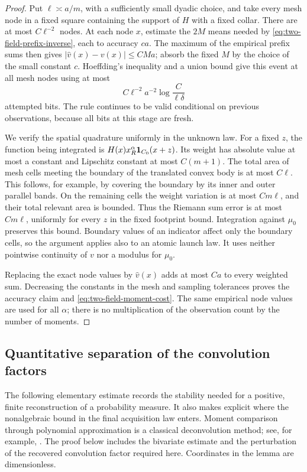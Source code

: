 \begin{proof}
Put $\ell\asymp a/m$, with a sufficiently small dyadic choice,
and take every mesh node in a fixed square containing the support
of $H$ with a fixed collar.  There are at most $C\ell^{-2}$ nodes.
At each node $x$, estimate the $2M$ means needed by
\eqref{eq:two-field-prefix-inverse}, each to accuracy $c a$.
The maximum of the empirical prefix sums then gives
$|\widehat v(x)-v(x)|\le C M a$; absorb the fixed $M$ by the
choice of the small constant $c$.  Hoeffding's inequality and a
union bound give this event at all mesh nodes using at most
\[
 C\ell^{-2}a^{-2}\log\frac{C}{\ell\delta}
\]
attempted bits.  The rule continues to be valid conditional on
previous observations, because all bits at this stage are fresh.

We verify the spatial quadrature uniformly in the unknown law.
For a fixed $z$, the function being integrated is
$H(x)x_R^\alpha\mathbf 1_{C_0}(x+z)$.  Its weight has absolute value
at most a constant and Lipschitz constant at most $C(m+1)$.
The total area of mesh cells meeting the boundary of the translated
convex body is at most $C\ell$.  This follows, for example, by
covering the boundary by its inner and outer parallel bands.
On the remaining cells the weight variation is at most $Cm\ell$,
and their total relevant area is bounded.  Thus the Riemann sum
error is at most $Cm\ell$, uniformly for every $z$ in the fixed
footprint bound.  Integration against $\mu_0$ preserves this bound.
Boundary values of an indicator affect only the boundary cells,
so the argument applies also to an atomic launch law.  It uses
neither pointwise continuity of $v$ nor a modulus for $\mu_0$.

Replacing the exact node values by $\widehat v(x)$ adds at most
$Ca$ to every weighted sum.  Decreasing the constants in the
mesh and sampling tolerances proves the accuracy claim and
\eqref{eq:two-field-moment-cost}.  The same empirical node values
are used for all $\alpha$; there is no multiplication of the
observation count by the number of moments.
\end{proof}

\subsection{Quantitative separation of the convolution factors}
The following elementary estimate records the stability needed for
a positive, finite reconstruction of a probability measure.  It also
makes explicit where the nonalgebraic bound in the final acquisition
law enters.  Moment comparison through polynomial approximation is a
classical deconvolution method; see, for example,
\cite[Section~2.3]{RigolletWeed}.  The proof below includes the
bivariate estimate and the perturbation of the recovered convolution
factor required here.  Coordinates in the lemma are dimensionless.

